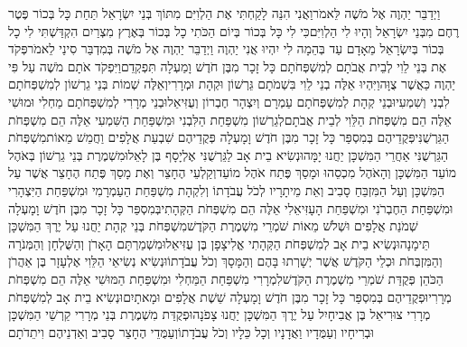 \documentclass[../main/main.tex]{subfiles}
\begin{document}
\begin{multicols}{\ncols}
וַיְדַבֵּר יַהְוֶה אֶל מֹשֶׁה לֵּאמֹר\PreVerseSpace{}וַאֲנִי הִנֵּה לָקַחְתִּי אֶת הַלְוִיִּם מִתּוֹךְ בְּנֵי יִשְׂרָאֵל תַּחַת כָּל בְּכוֹר פֶּטֶר רֶחֶם מִבְּנֵי יִשְׂרָאֵל וְהָיוּ לִי הַלְוִיִּם\PreVerseSpace{}כִּי לִי כָּל בְּכוֹר בְּיוֹם הַכֹּתִי כָל בְּכוֹר בְּאֶרֶץ מִצְרַיִם הִקְדַּשְׁתִּי לִי כָל בְּכוֹר בְּיִשְׂרָאֵל מֵאָדָם עַד בְּהֵמָה לִי יִהְיוּ אֲנִי יַהְוֶה \ClosedSection{}וַיְדַבֵּר יַהְוֶה אֶל מֹשֶׁה בְּמִדְבַּר סִינַי לֵאמֹר\PreVerseSpace{}פְּקֹד אֶת בְּנֵי לֵוִי לְבֵית אֲבֹתָם לְמִשְׁפְּחֹתָם כָּל זָכָר מִבֶּן חֹדֶשׁ וָמַעְלָה תִּפְקְדֵם\PreVerseSpace{}וַיִּפְקֹד אֹתָם מֹשֶׁה עַל פִּי יַהְוֶה כַּאֲשֶׁר צֻוָּה\PreVerseSpace{}וַיִּהְיוּ אֵלֶּה בְנֵי לֵוִי בִּשְׁמֹתָם גֵּרְשׁוֹן וּקְהָת וּמְרָרִי\PreVerseSpace{}וְאֵלֶּה שְׁמוֹת בְּנֵי גֵרְשׁוֹן לְמִשְׁפְּחֹתָם לִבְנִי וְשִׁמְעִי\PreVerseSpace{}וּבְנֵי קְהָת לְמִשְׁפְּחֹתָם עַמְרָם וְיִצְהָר חֶבְרוֹן וְעֻזִּיאֵל\PreVerseSpace{}וּבְנֵי מְרָרִי לְמִשְׁפְּחֹתָם מַחְלִי וּמוּשִׁי אֵלֶּה הֵם מִשְׁפְּחֹת הַלֵּוִי לְבֵית אֲבֹתָם\PreVerseSpace{}לְגֵרְשׁוֹן מִשְׁפַּחַת הַלִּבְנִי וּמִשְׁפַּחַת הַשִּׁמְעִי אֵלֶּה הֵם מִשְׁפְּחֹת הַגֵּרְשֻׁנִּי\PreVerseSpace{}פְּקֻדֵיהֶם בְּמִסְפַּר כָּל זָכָר מִבֶּן חֹדֶשׁ וָמָעְלָה פְּקֻדֵיהֶם שִׁבְעַת אֲלָפִים וַחֲמֵשׁ מֵאוֹת\PreVerseSpace{}מִשְׁפְּחֹת הַגֵּרְשֻׁנִּי אַחֲרֵי הַמִּשְׁכָּן יַחֲנוּ יָמָּה\PreVerseSpace{}וּנְשִׂיא בֵית אָב לַגֵּרְשֻׁנִּי אֶלְיָסָף בֶּן לָאֵל\PreVerseSpace{}וּמִשְׁמֶרֶת בְּנֵי גֵרְשׁוֹן בְּאֹהֶל מוֹעֵד הַמִּשְׁכָּן וְהָאֹהֶל מִכְסֵהוּ וּמָסַךְ פֶּתַח אֹהֶל מוֹעֵד\PreVerseSpace{}וְקַלְעֵי הֶחָצֵר וְאֶת מָסַךְ פֶּתַח הֶחָצֵר אֲשֶׁר עַל הַמִּשְׁכָּן וְעַל הַמִּזְבֵּחַ סָבִיב וְאֵת מֵיתָרָיו לְכֹל עֲבֹדָתוֹ \ClosedSection{}וְלִקְהָת מִשְׁפַּחַת הַעַמְרָמִי וּמִשְׁפַּחַת הַיִּצְהָרִי וּמִשְׁפַּחַת הַחֶבְרֹנִי וּמִשְׁפַּחַת הָעָזִּיאֵלִי אֵלֶּה הֵם מִשְׁפְּחֹת הַקְּהָתִי\PreVerseSpace{}בְּמִסְפַּר כָּל זָכָר מִבֶּן חֹדֶשׁ וָמָעְלָה שְׁמֹנַת אֲלָפִים וּשְׁלֹשׁ\SubEnd{} מֵאוֹת שֹׁמְרֵי מִשְׁמֶרֶת הַקֹּדֶשׁ\PreVerseSpace{}מִשְׁפְּחֹת בְּנֵי קְהָת יַחֲנוּ עַל יֶרֶךְ הַמִּשְׁכָּן תֵּימָנָה\PreVerseSpace{}וּנְשִׂיא בֵית אָב לְמִשְׁפְּחֹת הַקְּהָתִי אֱלִיצָפָן בֶּן עֻזִּיאֵל\PreVerseSpace{}וּמִשְׁמַרְתָּם הָאָרֹן וְהַשֻּׁלְחָן וְהַמְּנֹרָה וְהַמִּזְבְּחֹת וּכְלֵי הַקֹּדֶשׁ אֲשֶׁר יְשָׁרְתוּ בָּהֶם וְהַמָּסָךְ וְכֹל עֲבֹדָתוֹ\PreVerseSpace{}וּנְשִׂיא נְשִׂיאֵי הַלֵּוִי אֶלְעָזָר בֶּן אַהֲרֹן הַכֹּהֵן פְּקֻדַּת שֹׁמְרֵי מִשְׁמֶרֶת הַקֹּדֶשׁ\PreVerseSpace{}לִמְרָרִי מִשְׁפַּחַת הַמַּחְלִי וּמִשְׁפַּחַת הַמּוּשִׁי אֵלֶּה הֵם מִשְׁפְּחֹת מְרָרִי\PreVerseSpace{}וּפְקֻדֵיהֶם בְּמִסְפַּר כָּל זָכָר מִבֶּן חֹדֶשׁ וָמָעְלָה שֵׁשֶׁת אֲלָפִים וּמָאתָיִם\PreVerseSpace{}וּנְשִׂיא בֵית אָב לְמִשְׁפְּחֹת מְרָרִי צוּרִיאֵל בֶּן אֲבִיחָיִל עַל יֶרֶךְ הַמִּשְׁכָּן יַחֲנוּ צָפֹנָה\PreVerseSpace{}וּפְקֻדַּת מִשְׁמֶרֶת בְּנֵי מְרָרִי קַרְשֵׁי הַמִּשְׁכָּן וּבְרִיחָיו וְעַמֻּדָיו וַאֲדָנָיו וְכָל כֵּלָיו וְכֹל עֲבֹדָתוֹ\PreVerseSpace{}וְעַמֻּדֵי הֶחָצֵר סָבִיב וְאַדְנֵיהֶם וִיתֵדֹתָם 
\end{multicols}
\end{document}

